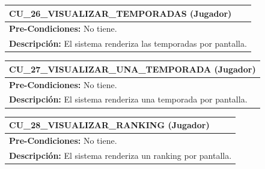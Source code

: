 \begin{center}
  \begin{tabular}{| p{7.5cm} | p{7.5cm} |}
    \hline
    \multicolumn{2}{|p{15cm}|}{\textbf{CU\_26\_VISUALIZAR\_TEMPORADAS} (Jugador)} \\ \hline
    \multicolumn{2}{|p{15cm}|}{\textbf{Pre-Condiciones:} No tiene.} \\ \hline
    \multicolumn{2}{|p{15cm}|}{\textbf{Descripción:} El sistema renderiza las temporadas por pantalla.} \\
    \hline
  \end{tabular}
  
  \label{table:usecase:26}
\end{center}

\begin{center}
  \begin{tabular}{| p{7.5cm} | p{7.5cm} |}
    \hline
    \multicolumn{2}{|p{15cm}|}{\textbf{CU\_27\_VISUALIZAR\_UNA\_TEMPORADA} (Jugador)} \\ \hline
    \multicolumn{2}{|p{15cm}|}{\textbf{Pre-Condiciones:} No tiene.} \\ \hline
    \multicolumn{2}{|p{15cm}|}{\textbf{Descripción:} El sistema renderiza una temporada por pantalla.} \\
    \hline
  \end{tabular}
  
  \label{table:usecase:27}
\end{center}

\begin{center}
  \begin{tabular}{| p{7.5cm} | p{7.5cm} |}
    \hline
    \multicolumn{2}{|p{15cm}|}{\textbf{CU\_28\_VISUALIZAR\_RANKING} (Jugador)} \\ \hline
    \multicolumn{2}{|p{15cm}|}{\textbf{Pre-Condiciones:} No tiene.} \\ \hline
    \multicolumn{2}{|p{15cm}|}{\textbf{Descripción:} El sistema renderiza un ranking por pantalla.} \\
    \hline
  \end{tabular}
  
  \label{table:usecase:28}
\end{center}


